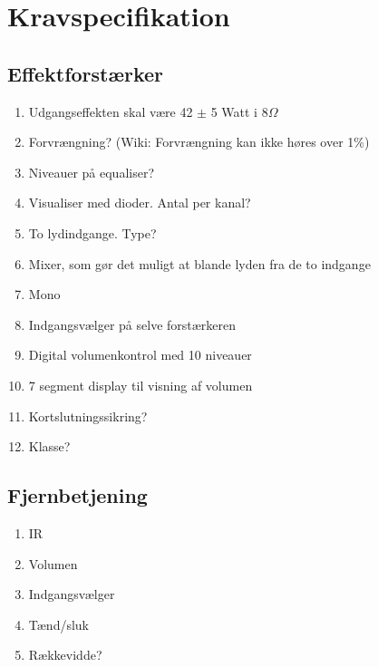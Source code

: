\chapter{Kravspecifikation}
\section*{Effektforstærker}
\begin{enumerate}
\item Udgangseffekten skal være 42 $\pm$ 5 Watt i 8$\Omega$
\item Forvrængning? (Wiki: Forvrængning kan ikke høres over 1\%)
\item Niveauer på equaliser?
\item Visualiser med dioder. Antal per kanal?
\item To lydindgange. Type?
\item Mixer, som gør det muligt at blande lyden fra de to indgange
\item Mono
\item Indgangsvælger på selve forstærkeren
\item Digital volumenkontrol med 10 niveauer
\item 7 segment display til visning af volumen
\item Kortslutningssikring?
\item Klasse?
\end{enumerate}

\section*{Fjernbetjening}
\begin{enumerate}
\item IR
\item Volumen
\item Indgangsvælger
\item Tænd/sluk
\item Rækkevidde?
\end{enumerate}